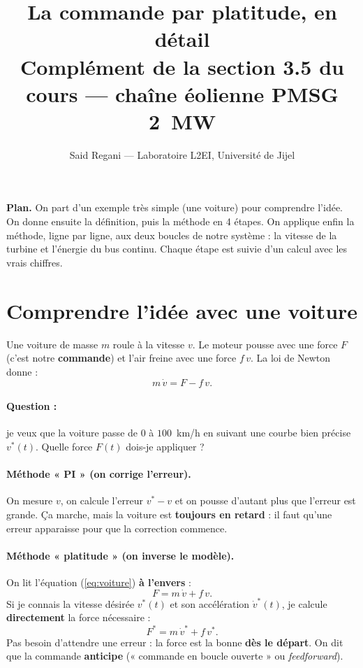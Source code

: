 \documentclass[11pt,a4paper]{article}
\title{\textbf{La commande par platitude, en détail}\\[2mm]
\large Complément de la section 3.5 du cours — chaîne éolienne PMSG 2~MW}
\author{Said Regani — Laboratoire L2EI, Université de Jijel}
\date{}
\begin{document}
\maketitle

\begin{idee}
\textbf{Plan.} On part d'un exemple très simple (une voiture) pour comprendre l'idée. On donne ensuite la
définition, puis la méthode en 4 étapes. On applique enfin la méthode, ligne par ligne, aux deux boucles
de notre système : la vitesse de la turbine et l'énergie du bus continu. Chaque étape est suivie d'un
calcul avec les vrais chiffres.
\end{idee}

\tableofcontents

\section{Comprendre l'idée avec une voiture}

Une voiture de masse $m$ roule à la vitesse $v$. Le moteur pousse avec une force $F$ (c'est notre
\textbf{commande}) et l'air freine avec une force $f\,v$. La loi de Newton donne :
\begin{equation}
m\,\dot v = F - f\,v .
\label{eq:voiture}
\end{equation}

\paragraph{Question :} je veux que la voiture passe de $0$ à $100$~km/h en suivant une courbe bien
précise $v^*(t)$. Quelle force $F(t)$ dois-je appliquer ?

\paragraph{Méthode « PI » (on corrige l'erreur).} On mesure $v$, on calcule l'erreur $v^*-v$ et on pousse
d'autant plus que l'erreur est grande. Ça marche, mais la voiture est \textbf{toujours en retard} : il faut
qu'une erreur apparaisse pour que la correction commence.

\paragraph{Méthode « platitude » (on inverse le modèle).} On lit l'équation (\ref{eq:voiture})
\textbf{à l'envers} :
\begin{equation}
F = m\,\dot v + f\,v .
\end{equation}
Si je connais la vitesse désirée $v^*(t)$ et son accélération $\dot v^*(t)$, je calcule \textbf{directement}
la force nécessaire :
\begin{equation}
F^* = m\,\dot v^* + f\,v^* .
\end{equation}
Pas besoin d'attendre une erreur : la force est la bonne \textbf{dès le départ}. On dit que la commande
\textbf{anticipe} (« commande en boucle ouverte » ou \emph{feedforward}).
\end{document}
